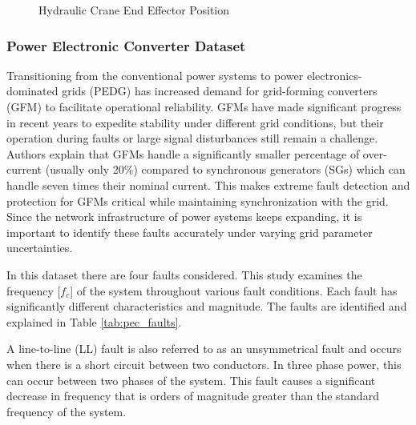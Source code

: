 \begin{figure}[H]
    
    \caption{Hydraulic Crane End Effector Position}
    \label{fig:hydraulic_pos}
\end{figure}

\subsubsection{Power Electronic Converter Dataset}
\label{ref_pec_dataset}

Transitioning from the conventional power systems to power electronics-dominated grids (PEDG) has increased demand for grid-forming converters (GFM) to facilitate operational reliability. GFMs have made significant progress in recent years %
to expedite stability under different grid conditions, but their operation during faults or large signal disturbances still remain a challenge. Authors \cite{trainsient-stability-9523750} explain that GFMs handle a significantly smaller percentage of over-current (usually only 20\%) compared to synchronous generators (SGs) which can handle seven times their nominal current. This makes extreme fault detection and protection for GFMs critical while maintaining synchronization with the grid. Since the network infrastructure of power systems keeps expanding, it is important to identify these faults accurately under varying grid parameter uncertainties.


In this dataset there are four faults considered. This study examines the frequency [$f_c$] of the system throughout various fault conditions. Each fault has significantly different characteristics and magnitude. The faults are identified and explained in Table \ref{tab:pec_faults}.



%     

A line-to-line (LL) fault is also referred to as an unsymmetrical fault and occurs when there is a short circuit between two conductors. In three phase power, this can occur between two phases of the system. This fault causes a significant decrease in frequency that is orders of magnitude greater than the standard frequency of the system.


